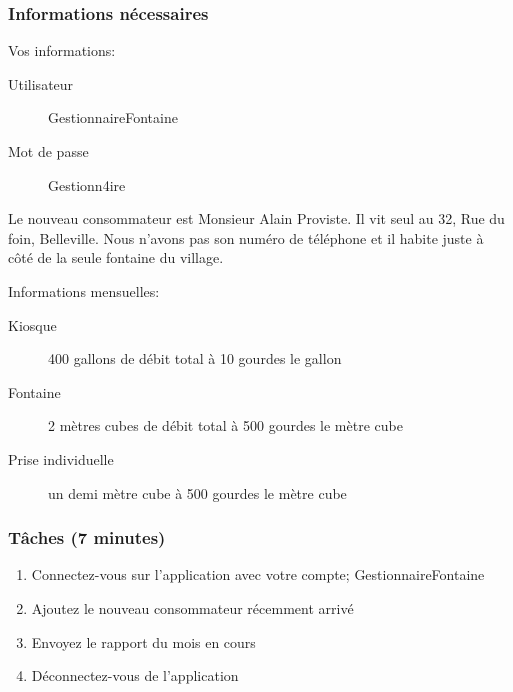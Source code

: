 \documentclass[a4paper, 11pt]{article}
\begin{document}
    \subsubsection*{Informations nécessaires}
    \begin{multicols}{2}
        Vos informations:
        \begin{description}
            \item[Utilisateur] GestionnaireFontaine
            \item[Mot de passe] Gestionn4ire
        \end{description}
        \vfill\null
        \columnbreak

        Le nouveau consommateur est Monsieur Alain Proviste. Il vit seul au 32, Rue du foin, Belleville. Nous n'avons pas son numéro de téléphone et il habite juste à côté de la seule fontaine du village.
    \end{multicols}
    Informations mensuelles:
    \begin{description}
        \item[Kiosque] 400 gallons de débit total à 10 gourdes le gallon
        \item[Fontaine] 2 mètres cubes de débit total à 500 gourdes le mètre cube
        \item[Prise individuelle] un demi mètre cube à 500 gourdes le mètre cube
    \end{description}

    \subsubsection*{Tâches (7 minutes)}
        \begin{enumerate}
            \item Connectez-vous sur l'application avec votre compte; GestionnaireFontaine
            \item Ajoutez le nouveau consommateur récemment arrivé
            \item Envoyez le rapport du mois en cours
            \item Déconnectez-vous de l'application
        \end{enumerate}

\newpage
\end{document}
